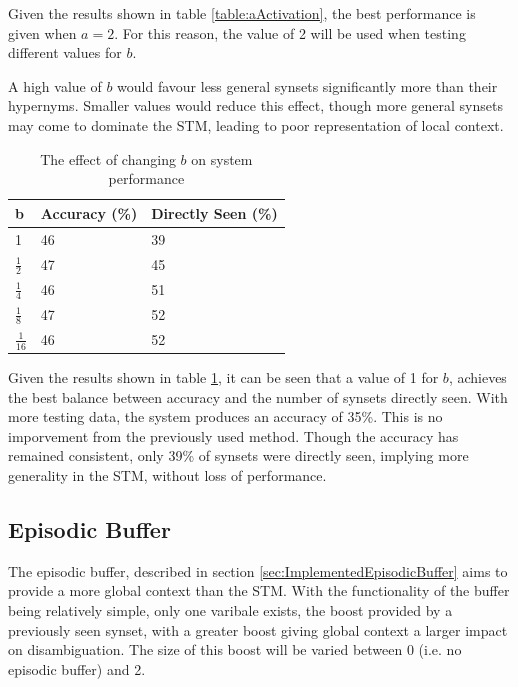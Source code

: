 \documentclass[]{article}
\begin{document}
Given the results shown in table \ref{table:aActivation}, the best performance is given when $a = 2$. For this reason, the value of 2 will be used when testing different values for $b$.

A high value of $b$ would favour less general synsets significantly more than their hypernyms. Smaller values would reduce this effect, though more general synsets may come to dominate the STM, leading to poor representation of local context.

\begin{table}
\begin{center}
\begin{tabular}{|p{2em}|p{7em}|p{7em}|}
	\hline
	b & Accuracy (\%) & Directly Seen (\%) \\
	\hline
	1 & 46 & 39\\
	\hline
	$\frac{1}{2}$ & 47 & 45\\
	\hline
	$\frac{1}{4}$ & 46 & 51\\
	\hline
	$\frac{1}{8}$ & 47 & 52\\
	\hline
	$\frac{1}{16}$ & 46 & 52\\
	\hline
\end{tabular}
\end{center}
\caption{The effect of changing $b$ on system performance}
\label{table:bActivation}
\end{table}

Given the results shown in table \ref{table:bActivation}, it can be seen that a value of 1 for $b$, achieves the best balance between accuracy and the number of synsets directly seen. With more testing data, the system produces an accuracy of 35\%. This is no imporvement from the previously used method. Though the accuracy has remained consistent, only 39\% of synsets were directly seen, implying more generality in the STM, without loss of performance.

\subsection{Episodic Buffer}
\label{sec:EvEpisodicBuffer}
The episodic buffer, described in section \ref{sec:ImplementedEpisodicBuffer} aims to provide a more global context than the STM. With the functionality of the buffer being relatively simple, only one varibale exists, the boost provided by a previously seen synset, with a greater boost giving global context a larger impact on disambiguation. The size of this boost will be varied between 0 (i.e. no episodic buffer) and 2.
\end{document}
